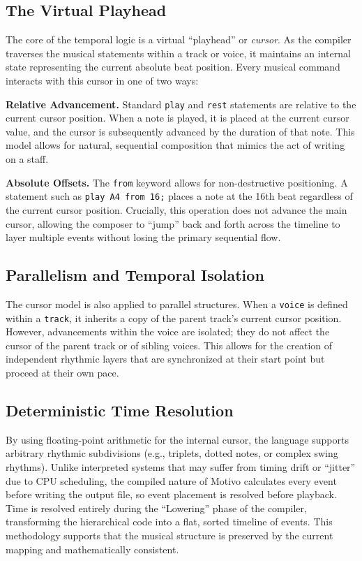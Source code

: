 \subsection{The Virtual Playhead}\label{detail-subsec:the-virtual-playhead}

The core of the temporal logic is a virtual ``playhead'' or \textit{cursor}.
As the compiler traverses the musical statements within a track or voice, it maintains an internal state representing
the current absolute beat position.
Every musical command interacts with this cursor in one of two ways:

\noindent \textbf{Relative Advancement.} Standard \texttt{play} and \texttt{rest} statements are relative to the current
cursor position.
When a note is played, it is placed at the current cursor value, and the cursor is subsequently advanced by the
duration of that note.
This model allows for natural, sequential composition that mimics the act of writing on a staff.

\noindent \textbf{Absolute Offsets.} The \texttt{from} keyword allows for non-destructive positioning.
A statement such as \texttt{play A4 from 16;} places a note at the 16th beat regardless of the current cursor
position.
Crucially, this operation does not advance the main cursor, allowing the composer to ``jump'' back and forth across
the timeline to layer multiple events without losing the primary sequential flow.

\subsection{Parallelism and Temporal Isolation}\label{detail-subsec:parallelism-and-temporal-isolation}

The cursor model is also applied to parallel structures.
When a \texttt{voice} is defined within a \texttt{track}, it inherits a copy of the parent track's current cursor
position.
However, advancements within the voice are isolated; they do not affect the cursor of the parent track or of sibling
voices.
This allows for the creation of independent rhythmic layers that are synchronized at their start point but proceed at
their own pace.

\subsection{Deterministic Time Resolution}\label{detail-subsec:deterministic-time-resolution}

By using floating-point arithmetic for the internal cursor, the language supports arbitrary rhythmic subdivisions
(e.g., triplets, dotted notes, or complex swing rhythms).
Unlike interpreted systems that may suffer from timing drift or ``jitter'' due to CPU scheduling, the compiled nature of
Motivo calculates every event before writing the output file, so event placement is resolved before playback.
Time is resolved entirely during the ``Lowering'' phase of the compiler, transforming the hierarchical code into a flat,
sorted timeline of events.
This methodology supports that the musical structure is preserved by the current mapping and mathematically consistent.

